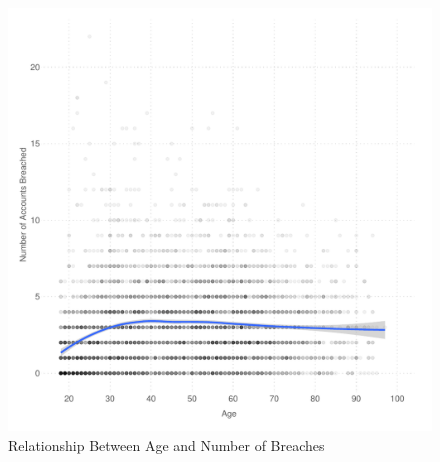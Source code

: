 \documentclass[12pt, letterpaper]{article}
\begin{document}
\begin{figure}[H]
  \centering
   \caption{Relationship Between Age and Number of Breaches  
  \label{fig:age_breaches}}
    \includegraphics[scale=.75]{../figs/age_pwned.pdf}
\end{figure}
\end{document}
